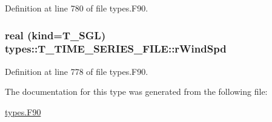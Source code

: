 Definition at line 780 of file types.F90.

\hypertarget{typetypes_1_1_t___t_i_m_e___s_e_r_i_e_s___f_i_l_e_ac2dbf2ef9df9d1d64eb80e14fa598f93}{
\subsubsection[{rWindSpd}]{\setlength{\rightskip}{0pt plus 5cm}real (kind={\bf T\_\-SGL}) {\bf types::T\_\-TIME\_\-SERIES\_\-FILE::rWindSpd}}}
\label{typetypes_1_1_t___t_i_m_e___s_e_r_i_e_s___f_i_l_e_ac2dbf2ef9df9d1d64eb80e14fa598f93}


Definition at line 778 of file types.F90.



The documentation for this type was generated from the following file:\begin{DoxyCompactItemize}
\item 
\hyperlink{types_8_f90}{types.F90}\end{DoxyCompactItemize}

